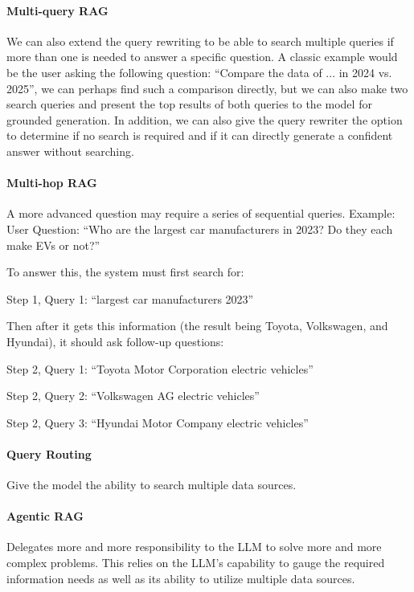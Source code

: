 \documentclass[11pt]{article}  %
\begin{document}
\paragraph{Multi-query RAG}
We can also extend the query rewriting to be able to search multiple queries if more than one is needed to answer a specific question. 
A classic example would be the user asking the following question: ``Compare the data of ... in 2024 vs. 2025'', we can perhaps find such a comparison directly, but we can also make two search queries and present the top results of both queries to the model for grounded generation.
In addition, we can also give the query rewriter the option to determine if no search is required and if it can directly generate a confident answer without searching.


\paragraph{Multi-hop RAG}
A more advanced question may require a series of sequential queries. 
Example:  User Question: ``Who are the largest car manufacturers in 2023? Do they each make EVs or not?''

To answer this, the system must first search for: 

Step 1, Query 1: ``largest car manufacturers 2023''

Then after it gets this information (the result being Toyota, Volkswagen, and Hyundai), it should ask follow-up questions:


Step 2, Query 1: ``Toyota Motor Corporation electric vehicles''

Step 2, Query 2: ``Volkswagen AG electric vehicles''

Step 2, Query 3: ``Hyundai Motor Company electric vehicles''


\paragraph{Query Routing}
Give the model the ability to search multiple data sources.

\paragraph{Agentic RAG}
Delegates more and more responsibility to the LLM to solve more and more complex problems.
This relies on the LLM's capability to gauge the required information needs as well as its ability to utilize multiple data sources. 
\end{document}

